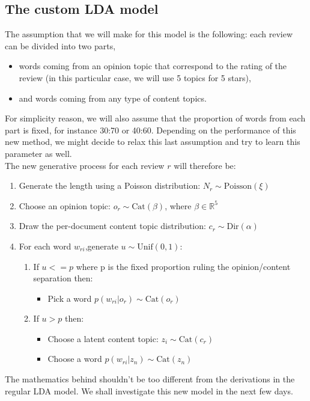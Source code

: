 \documentclass[paper=a4, fontsize=11pt]{scrartcl} %
\numberwithin{equation}{section}
\numberwithin{figure}{section}
\numberwithin{table}{section}
\begin{document}
\subsection{The custom LDA model}

The assumption that we will make for this model is the following: each review can be divided into two parts,
\begin{itemize}
\item words coming from an opinion topic that correspond to the rating of the review (in this particular case, we will use 5 topics for 5 stars),
\item and words coming from any type of content topics.
\end{itemize}
For simplicity reason, we will also assume that the proportion of words from each part is fixed, for instance 30:70 or 40:60. Depending on the performance of this new method, we might decide to relax this last assumption and try to learn this parameter as well.\\

The new generative process for each review $r$ will therefore be:
\begin{enumerate}
\item Generate the length using a Poisson distribution: $N_r \sim \text{Poisson}(\xi)$
\item Choose an opinion topic: $o_r \sim \text{Cat}(\beta)$, where $\beta \in \mathbb{R}^5$ 
\item Draw the per-document content topic distribution: $c_r\sim \text{Dir}(\alpha)$
\item For each word $w_{ri}$,\quad generate $u \sim \text{Unif}(0,1)$:
	\begin{enumerate}
	\item If $u<=p$ where p is the fixed proportion ruling the opinion/content separation then:
		\begin{itemize}
		\item Pick a word $p(w_{ri} | o_r) \sim \text{Cat}(o_r)$
		\end{itemize}
	\item If $u>p$ then:
		\begin{itemize}
		\item Choose a latent content topic: $z_i \sim \text{Cat}(c_r)$
		\item Choose a word $p(w_{ri} | z_n) \sim \text{Cat}(z_n)$
		\end{itemize}
	\end{enumerate}
\end{enumerate}
The mathematics behind shouldn't be too different from the derivations in the regular LDA model. We shall investigate this new model in the next few days.
\end{document}
